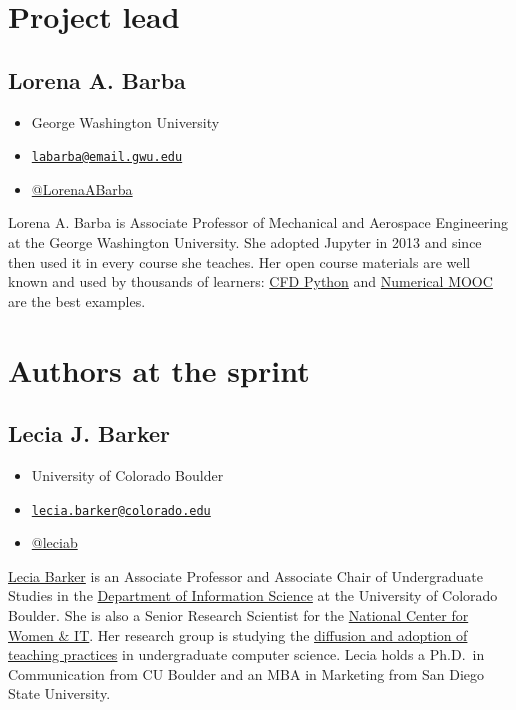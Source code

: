 \documentclass[]{book}
\providecommand{\tightlist}{%
  \setlength{\itemsep}{0pt}\setlength{\parskip}{0pt}}
\begin{document}
\section{Project lead}\label{project-lead}

\subsection*{Lorena A. Barba}\label{lorena-a.-barba}

\begin{itemize}
\tightlist
\item
  George Washington University
\item
  \href{mailto:labarba@email.gwu.edu}{\nolinkurl{labarba@email.gwu.edu}}
\item
  \href{https://twitter.com/LorenaABarba}{@LorenaABarba}
\end{itemize}

Lorena A. Barba is Associate Professor of Mechanical and Aerospace
Engineering at the George Washington University. She adopted Jupyter in
2013 and since then used it in every course she teaches. Her open course
materials are well known and used by thousands of learners:
\href{http://lorenabarba.com/blog/cfd-python-12-steps-to-navier-stokes/}{CFD
Python} and
\href{https://github.com/numerical-mooc/numerical-mooc}{Numerical MOOC}
are the best examples.

\section{Authors at the sprint}\label{authors-at-the-sprint}

\subsection*{Lecia J. Barker}\label{lecia-j.-barker}

\begin{itemize}
\tightlist
\item
  University of Colorado Boulder
\item
  \href{mailto:lecia.barker@colorado.edu}{\nolinkurl{lecia.barker@colorado.edu}}
\item
  \href{https://twitter.com/leciab}{@leciab}
\end{itemize}

\href{https://www.colorado.edu/cmci/people/information-science/lecia-barker}{Lecia
Barker} is an Associate Professor and Associate Chair of Undergraduate
Studies in the
\href{https://www.colorado.edu/cmci/infoscience}{Department of
Information Science} at the University of Colorado Boulder. She is also
a Senior Research Scientist for the
\href{https://www.ncwit.org/}{National Center for Women \& IT}. Her
research group is studying the
\href{https://csteachingpractices.wordpress.com/}{diffusion and adoption
of teaching practices} in undergraduate computer science. Lecia holds a
Ph.D.~in Communication from CU Boulder and an MBA in Marketing from San
Diego State University.
\end{document}
